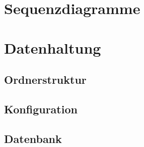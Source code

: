 \documentclass[a4paper]{scrreprt}
\begin{document}
    \chapter{Sequenzdiagramme}

    \chapter{Datenhaltung}
        \section{Ordnerstruktur}
        \section{Konfiguration}
        \section{Datenbank}
\end{document}
